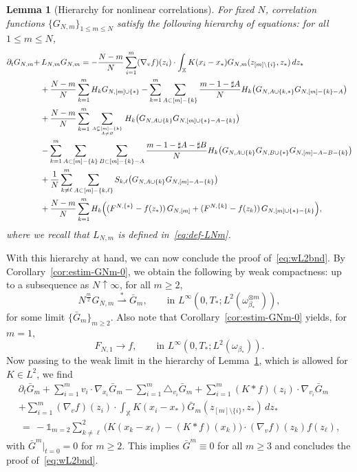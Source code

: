 \documentclass[a4paper,11pt,reqno,noindent]{amsart}
\theoremstyle{plain}
\newtheorem{lem}[theor]{Lemma}
\theoremstyle{definition}
\numberwithin{equation}{section}
\newcommand{\Xd}{\mathbb X}
\begin{document}
\begin{lem}[Hierarchy for nonlinear correlations]\label{lem:hier-corr}
For fixed $N$, correlation functions $\{G_{N,m}\}_{1 \le m\le N}$ satisfy the following hierarchy of equations: for all $1\le m\le N$,
\begin{align*}
\partial_t G_{N,m}+&\, L_{N,m} G_{N,m}  = -\frac{N-m}N\sum_{i=1}^m(\nabla_{v}f)(z_i)\cdot\int_{\Xd}K(x_i-x_*)G_{N,m}(z_{[m]\setminus\{i\}},z_*)\,d z_*\\
&+\frac{N-m}{N} \sum_{k=1}^m H_k G_{N,[ m ] \cup \{\ast\}}
-  \sum_{k=1}^m \sum_{A \subset [ m ] - \{k\}} \frac{m-1-\sharp A}{N} H_k\big(G_{N,A \cup \{k, \ast\}} G_{N,[ m ] - \{k\} - A} \big)\\
&+  \frac{N-m}{N} \sum_{k=1}^m \sum_{A \subsetneq [ m ] - \{k\}\atop A\ne\varnothing} H_k\big( G_{N,A \cup \{k\}} G_{N,[ m ] \cup \{\ast\} - A - \{k\}} \big) \\
&-  \sum_{k=1}^m \sum_{A \subset [ m] - \{k\}} \sum_{B\subset [ m] - \{k\} - A} \frac{m-1-\sharp A-\sharp B}{N} H_k\big( G_{N,A \cup \{k\}} G_{N,B \cup \{*\}} G_{N,[ m] - A-B - \{k\}} \big) \\
&+ \frac{1}{N} \sum_{k \ne \ell}^m \sum_{A \subset [ m] - \{k , \ell \}} S_{k, \ell}\big( G_{N,A \cup \{k\}} G_{N,[ m] - A - \{k\}}\big) \\
&+ \frac{N-m}{N} \sum_{k=1}^m H_k \Big( (F^{N,\{*\}}-f(z_*))\, G_{N,[ m ]} + (F^{N,\{k\}}-f(z_k))\, G_{N, [ m ] \cup \{*\}-\{k\}} \Big),
\end{align*}
where we recall that $L_{N,m}$ is defined in~\eqref{eq:def-LNm}.
\end{lem}

With this hierarchy at hand, we can now conclude the proof of~\eqref{eq:wL2bnd}.
By Corollary~\ref{cor:estim-GNm-0}, we obtain the following by weak compactness: up to a subsequence as $N\uparrow\infty$, for all $m\ge2$,
\begin{equation}\label{eq:conv-GNm}
N^{\frac m2}G_{N,m}\overset*\rightharpoonup \bar G_m,\qquad\text{in $L^\infty(0,T_*;L^2(\omega_{\beta_*}^{\otimes m}))$},
\end{equation}
for some limit $\{\bar G_m\}_{m\ge2}$. Also note that Corollary~\ref{cor:estim-GNm-0} yields, for $m=1$,
\[F_{N,1}\to f,\qquad\text{in $L^\infty(0,T_*;L^2(\omega_{\beta_*}))$}.\]
Now passing to the weak limit in the hierarchy of Lemma~\ref{lem:hier-corr}, which is allowed for $K\in L^2$, we find
\begin{multline}\label{eq:conv-lim-GNm}
\partial_t \bar G_{m}
+\sum_{i=1}^mv_i\cdot\nabla_{x_i}\bar G_{m}
-\sum_{i=1}^m\triangle_{v_i}\bar G_{m}
+\sum_{i=1}^m (K\ast f)(z_i)\cdot\nabla_{v_i}\bar G_{m}\\
+\sum_{i=1}^m(\nabla_{v}f)(z_i)\cdot\int_{\Xd}K(x_i-x_*)\bar G_{m}(z_{[m]\setminus\{i\}},z_*)\,d z_*\\
\,=\,
-\mathds1_{m=2}\sum_{k\ne\ell}^2\Big(K(x_k-x_\ell)-(K\ast f)(x_k)\Big)\cdot(\nabla_vf)(z_k)f(z_\ell),
\end{multline}
with $\bar G^m|_{t=0}=0$ for $m\ge2$.
This implies $\bar G^m\equiv0$ for all $m\ge3$ and concludes the proof of~\eqref{eq:wL2bnd}.
\end{document}
